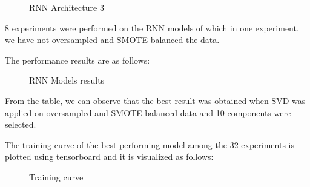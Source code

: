 \begin{figure}
%
  \caption{RNN Architecture 3}
  \label{fig:key}
\end{figure}
 
8 experiments were performed on the RNN models of which in one experiment, we have not oversampled and SMOTE balanced the data. 

The performance results are as follows:

 \begin{figure}
%
  \caption{RNN Models results}
  \label{fig:key}
\end{figure}

From the table, we can observe that the best result was obtained when SVD was applied on oversampled and SMOTE balanced data and 10 components were selected. 

The training curve of the best performing model among the 32 experiments is plotted using tensorboard and it is visualized as follows:

 \begin{figure}
%
  \caption{Training curve}
  \label{fig:key}
\end{figure}

